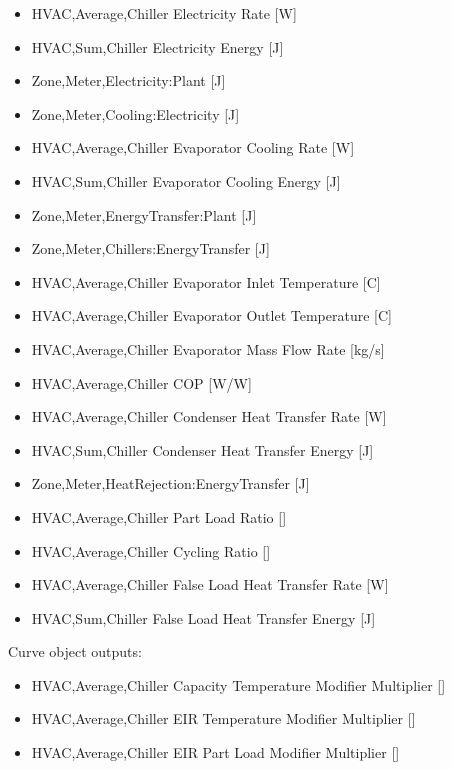 \begin{itemize}
    \item
    HVAC,Average,Chiller Electricity Rate {[}W{]}
    \item
    HVAC,Sum,Chiller Electricity Energy {[}J{]}
    \item
    Zone,Meter,Electricity:Plant {[}J{]}
    \item
    Zone,Meter,Cooling:Electricity {[}J{]}
    \item
    HVAC,Average,Chiller Evaporator Cooling Rate {[}W{]}
    \item
    HVAC,Sum,Chiller Evaporator Cooling Energy {[}J{]}
    \item
    Zone,Meter,EnergyTransfer:Plant {[}J{]}
    \item
    Zone,Meter,Chillers:EnergyTransfer {[}J{]}
    \item
    HVAC,Average,Chiller Evaporator Inlet Temperature {[}C{]}
    \item
    HVAC,Average,Chiller Evaporator Outlet Temperature {[}C{]}
    \item
    HVAC,Average,Chiller Evaporator Mass Flow Rate {[}kg/s{]}
    \item
    HVAC,Average,Chiller COP {[}W/W{]}
    \item
    HVAC,Average,Chiller Condenser Heat Transfer Rate {[}W{]}
    \item
    HVAC,Sum,Chiller Condenser Heat Transfer Energy {[}J{]}
    \item
    Zone,Meter,HeatRejection:EnergyTransfer {[}J{]}
    \item
    HVAC,Average,Chiller Part Load Ratio {[]}
    \item
    HVAC,Average,Chiller Cycling Ratio {[]}
    \item
    HVAC,Average,Chiller False Load Heat Transfer Rate {[}W{]}
    \item
    HVAC,Sum,Chiller False Load Heat Transfer Energy {[}J{]}
\end{itemize}

Curve object outputs:

\begin{itemize}
    \item
    HVAC,Average,Chiller Capacity Temperature Modifier Multiplier {[]}
    \item
    HVAC,Average,Chiller EIR Temperature Modifier Multiplier {[]}
    \item
    HVAC,Average,Chiller EIR Part Load Modifier Multiplier {[]}
\end{itemize}

